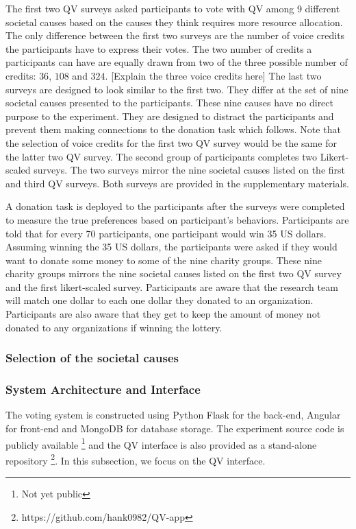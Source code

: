 The first two QV surveys asked participants to vote with QV among 9 different societal causes 
based on the causes they think requires more resource allocation. 
The only difference between the first two surveys 
are the number of voice credits the participants have to express their votes. 
The two number of credits a participants can have are equally drawn from 
two of the three possible number of credits: $36$, $108$ and $324$. 
[Explain the three voice credits here] 
The last two surveys are designed to look similar to the first two.
They differ at the set of nine societal causes presented to the participants.
These nine causes have no direct purpose to the experiment. 
They are designed to distract the participants and 
prevent them making connections to the donation task which follows.
Note that the selection of voice credits 
for the first two QV survey 
would be the same for the latter two QV survey. 
The second group of participants 
completes two Likert-scaled surveys.
The two surveys mirror the nine societal causes 
listed on the first and third QV surveys.
Both surveys are provided in the supplementary materials.\par

A donation task is deployed to the participants after the surveys were completed
to measure the true preferences based on participant's behaviors.
Participants are told that for every 70 participants, one participant would win 35 US dollars.
Assuming winning the 35 US dollars, 
the participants were asked if they would want to donate 
some money to some of the nine charity groups.
These nine charity groups mirrors the nine societal causes 
listed on the first two QV survey and the first likert-scaled survey.
Participants are aware that 
the research team will match one dollar to each one dollar they donated to an organization. 
Participants are also aware that 
they get to keep the amount of money not donated to any organizations if winning the lottery.\par

\subsubsection{Selection of the societal causes}


\subsubsection{System Architecture and Interface}
The voting system is constructed using Python Flask for the back-end, 
Angular for front-end and 
MongoDB for database storage. 
The experiment source code is publicly available \footnote{Not yet public} 
and the QV interface is also provided as a stand-alone repository \footnote{https://github.com/hank0982/QV-app}.
In this subsection,
we focus on the QV interface.\par

